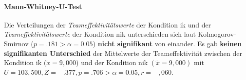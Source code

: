\documentclass[a4paper,11pt]{article}%
\renewcommand{\\}{\vspace*{0.5\baselineskip} \newline}
\begin{document}

\paragraph{Mann-Whitney-U-Test}
Die Verteilungen der \textit{Teameffektivitätswerte} der Kondition \ac{ik} und der \textit{Teameffektivitätswerte} der Kondition \ac{nik} unterschieden sich laut Kolmogorov-Smirnov ($p = .181 > \alpha = 0.05$) \textbf{nicht signifikant} von einander. Es gab \textbf{keinen signifikanten Unterschied} der Mittelwerte der Teameffektivität zwischen der Kondition \ac{ik} $(\tilde x = 9,000$) und der Kondition \ac{nik} $(\tilde x = 9,000)$ mit $U = 103,500, Z = -.377, p = .706 > \alpha = 0.05, r = -,060$. \\
\end{document}
